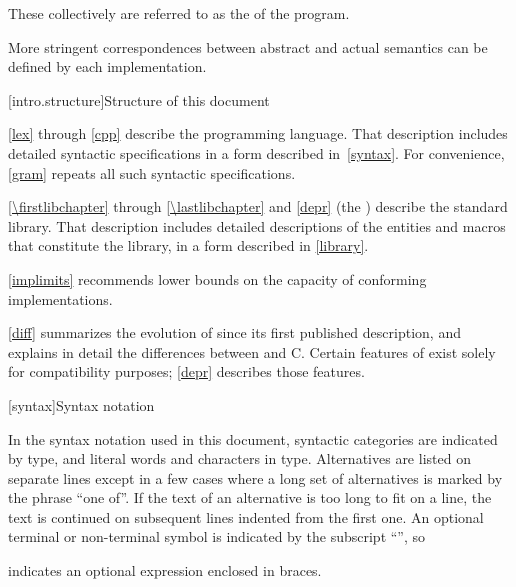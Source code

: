 These collectively are referred to as the
 of the program.
\begin{note}
More stringent correspondences between abstract and actual
semantics can be defined by each implementation.
\end{note}
%

[intro.structure]{Structure of this document}

\pnum
{}%
%
\ref{lex} through \ref{cpp} describe the \Cpp{} programming
language. That description includes detailed syntactic specifications in
a form described in~\ref{syntax}. For convenience, \ref{gram}
repeats all such syntactic specifications.

\pnum
\ref{\firstlibchapter} through \ref{\lastlibchapter} and \ref{depr}
(the ) describe the \Cpp{} standard library.
That description includes detailed descriptions of the
entities and macros
that constitute the library, in a form described in \ref{library}.

\pnum
\ref{implimits} recommends lower bounds on the capacity of conforming
implementations.

\pnum
\ref{diff} summarizes the evolution of \Cpp{} since its first
published description, and explains in detail the differences between
\Cpp{} and C\@. Certain features of \Cpp{} exist solely for compatibility
purposes; \ref{depr} describes those features.

[syntax]{Syntax notation}

\pnum
{}%
In the syntax notation used in this document, syntactic
categories are indicated by  type, and literal words
and characters in   type. Alternatives are
listed on separate lines except in a few cases where a long set of
alternatives is marked by the phrase ``one of''. If the text of an alternative is too long to fit on a line, the text is continued on subsequent lines indented from the first one.
An optional terminal or non-terminal symbol is indicated by the subscript
``\opt{\relax}'', so
\begin{ncbnf}
\terminal{\{}  \terminal{\}}
\end{ncbnf}
indicates an optional expression enclosed in braces.%

